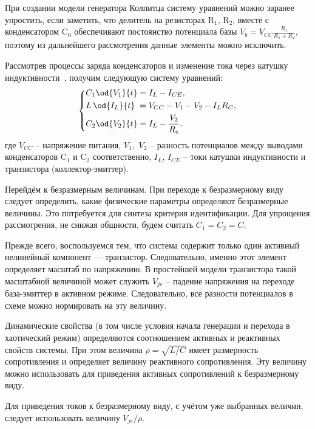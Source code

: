 При создании модели генератора Колпитца систему уравнений можно
заранее упростить, если заметить, что
делитель на резисторах
$\mathrm{R}_1$, $\mathrm{R}_2$,
вместе с конденсатором
$\mathrm{C}_0$ обеспечивают
постоянство потенциала базы
$V_b = V_{CC} \frac{R_1}{R_1+R_2}$,
поэтому из дальнейшего рассмотрения данные элементы можно
исключить.

Рассмотрев процессы заряда конденсаторов и изменение тока через
катушку индуктивности~\cite{zaeplnii_radio_calc},
получим следующую систему уравнений:
%
\begin{equation}
\label{atu:eq:colp_phys}
\begin{dcases}
  C_1 \od{V_{1}}{t}  = I_L - I_{CE} , \\
  L\, \od{I_L}{t} \; = V_{CC} - V_{1} - V_{2} - I_L R_C , \\
  C_2 \od{V_{2}}{t}  = I_L - \frac{V_{2}}{R_e}.
\end{dcases}
\end{equation}
%
%
где
$V_{CC} $ -- напряжение питания,
$V_1,$ $V_2$ -- разность потенциалов между выводами конденсаторов
$\mathrm{C}_1$ и $\mathrm{C}_2$ соответственно,
$I_L$, $I_{CE}$ -- токи катушки индуктивности и транзистора (коллектор-эмиттер).

Перейдём к безразмерным величинам.
При переходе к безразмерному виду следует определить,
какие физические параметры определяют безразмерные величины.
Это потребуется для синтеза критерия идентификации.
Для упрощения рассмотрения, не снижая общности,
будем считать $C_1 = C_2 = C$.

Прежде всего, воспользуемся тем, что система содержит только один
активный нелинейный компонент --- транзистор.
Следовательно, именно этот элемент определяет
масштаб по напряжению. В простейшей модели транзистора
такой масштабной величиной может служить
$V_{je}$ -- падение напряжения на переходе база-эмиттер
в активном режиме. Следовательно, все разности потенциалов в схеме можно нормировать
на эту величину.

Динамические свойства (в том числе условия начала генерации и перехода в хаотический режим) определяются
соотношением активных и реактивных свойств системы. При этом величина
$ \rho = \sqrt{L/C} $ имеет размерность сопротивления
и определяет величину реактивного сопротивления. Эту величину можно использовать
для приведения активных сопротивлений к безразмерному виду.

Для приведения токов к безразмерному виду, с учётом уже выбранных величин,
следует использовать величину $ V_{je} / \rho$.


